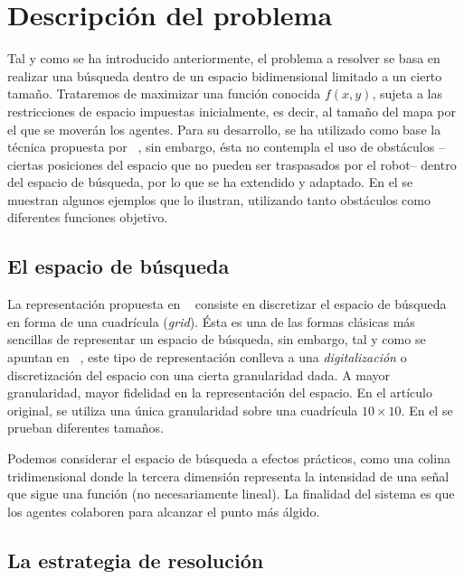 
    \section{Descripción del problema}
    \label{sec:descripcion}
    Tal y como se ha introducido anteriormente, el problema a resolver se basa en realizar una búsqueda dentro de un espacio bidimensional limitado a un cierto tamaño. Trataremos de maximizar una función conocida $f(x,y)$, sujeta a las restricciones de espacio impuestas inicialmente, es decir, al tamaño del mapa por el que se moverán los agentes.
    Para su desarrollo, se ha utilizado como base la técnica propuesta por ~\cite{initialPaper}, sin embargo, ésta no contempla el uso de obstáculos --ciertas posiciones del espacio que no pueden ser traspasados por el robot-- dentro del espacio de búsqueda, por lo que se ha extendido y adaptado.
    En el  se muestran algunos ejemplos que lo ilustran, utilizando tanto obstáculos como diferentes funciones objetivo.


    \subsection{El espacio de búsqueda}
    \label{sec:espacio}

    La representación propuesta en ~\cite{initialPaper} consiste en discretizar el espacio de búsqueda en forma de una cuadrícula (\textit{grid}). Ésta es una de las formas clásicas más sencillas de representar un espacio de búsqueda, sin embargo, tal y como se apuntan en ~\cite{AIRobotics}, este tipo de representación conlleva a una \textit{digitalización} o discretización del espacio con una cierta granularidad dada. A mayor granularidad, mayor fidelidad en la representación del espacio. En el artículo original, se utiliza una única granularidad sobre una cuadrícula $10 \times 10$. En el  se prueban diferentes tamaños.

    Podemos considerar el espacio de búsqueda a efectos prácticos, como una colina tridimensional donde la tercera dimensión representa la intensidad de una señal que sigue una función (no necesariamente lineal). La finalidad del sistema es que los agentes colaboren para alcanzar el punto más álgido.

    \subsection{La estrategia de resolución}

